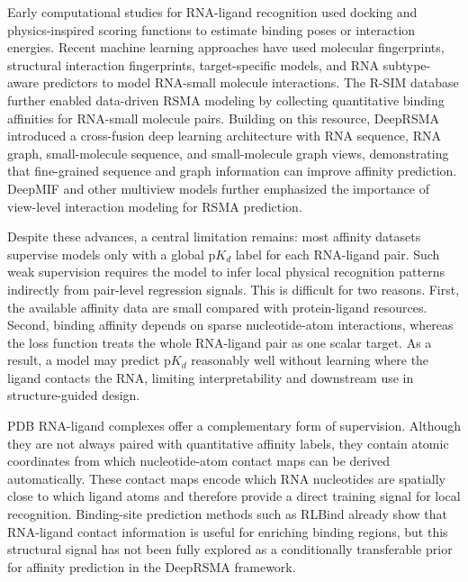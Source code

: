 \documentclass[journal=jcisd8,manuscript=article]{achemso}
\begin{document}
Early computational studies for RNA-ligand recognition used docking and physics-inspired scoring functions to estimate binding poses or interaction energies.\cite{Guilbert2008DockingRNA,Feng2020ITScoreNL} Recent machine learning approaches have used molecular fingerprints, structural interaction fingerprints, target-specific models, and RNA subtype-aware predictors to model RNA-small molecule interactions.\cite{Grimberg2022MLRNA,Szulc2023FingeRNAt,Krishnan2024RSAPred} The R-SIM database further enabled data-driven RSMA modeling by collecting quantitative binding affinities for RNA-small molecule pairs.\cite{Krishnan2023RSIM} Building on this resource, DeepRSMA introduced a cross-fusion deep learning architecture with RNA sequence, RNA graph, small-molecule sequence, and small-molecule graph views, demonstrating that fine-grained sequence and graph information can improve affinity prediction.\cite{Huang2024DeepRSMA} DeepMIF and other multiview models further emphasized the importance of view-level interaction modeling for RSMA prediction.\cite{Song2026DeepMIF,Wu2025MultiviewRNA}

Despite these advances, a central limitation remains: most affinity datasets supervise models only with a global p$K_d$ label for each RNA-ligand pair. Such weak supervision requires the model to infer local physical recognition patterns indirectly from pair-level regression signals. This is difficult for two reasons. First, the available affinity data are small compared with protein-ligand resources. Second, binding affinity depends on sparse nucleotide-atom interactions, whereas the loss function treats the whole RNA-ligand pair as one scalar target. As a result, a model may predict p$K_d$ reasonably well without learning where the ligand contacts the RNA, limiting interpretability and downstream use in structure-guided design.

PDB RNA-ligand complexes offer a complementary form of supervision. Although they are not always paired with quantitative affinity labels, they contain atomic coordinates from which nucleotide-atom contact maps can be derived automatically. These contact maps encode which RNA nucleotides are spatially close to which ligand atoms and therefore provide a direct training signal for local recognition. Binding-site prediction methods such as RLBind already show that RNA-ligand contact information is useful for enriching binding regions,\cite{Wang2023RLBind} but this structural signal has not been fully explored as a conditionally transferable prior for affinity prediction in the DeepRSMA framework.
\end{document}
